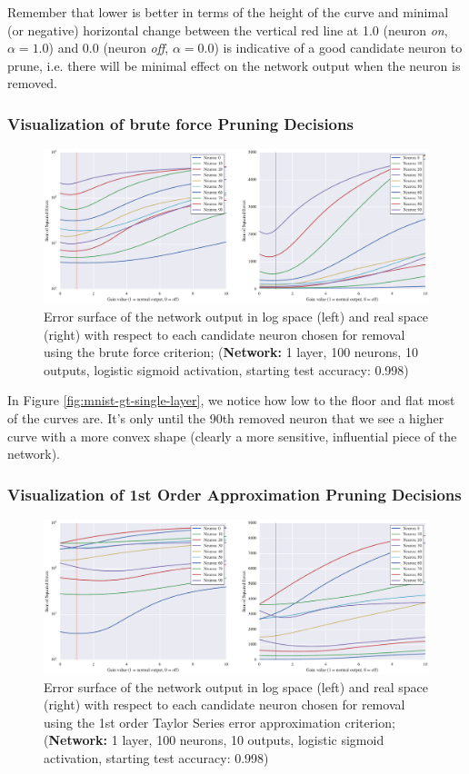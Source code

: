 Remember that lower is better in terms of the height of the curve and minimal (or negative) horizontal change between the vertical red line at 1.0 (neuron \textit{on}, $\alpha = 1.0$) and 0.0 (neuron \textit{off}, $\alpha = 0.0$) is indicative of a good candidate neuron to prune, i.e. there will be minimal effect on the network output when the neuron is removed. 

\subsubsection{Visualization of brute force Pruning Decisions}
\begin{figure}[!ht]
\centering
\includegraphics[width=\linewidth]{png/mnist-acc99-gt-gain.pdf}
\caption{Error surface of the network output in log space (left) and real space (right) with respect to each candidate neuron chosen for removal using the brute force criterion; (\textbf{Network:} 1 layer, 100 neurons, 10 outputs, logistic sigmoid activation, starting test accuracy: 0.998)}
\label{fig:mnist-single-layer-gt}
\end{figure}

In Figure \ref{fig:mnist-gt-single-layer}, we notice how low to the floor and flat most of the curves are. It's only until the 90th removed neuron that we see a higher curve with a more convex shape (clearly a more sensitive, influential piece of the network). 

\subsubsection{Visualization of 1st Order Approximation Pruning Decisions}
\begin{figure}[!ht]
\centering
\includegraphics[width=\linewidth]{png/mnist-acc99-g1-gain.pdf}
\caption{Error surface of the network output in log space (left) and real space (right) with respect to each candidate neuron chosen for removal using the 1st order Taylor Series error approximation criterion; (\textbf{Network:} 1 layer, 100 neurons, 10 outputs, logistic sigmoid activation, starting test accuracy: 0.998)}
\label{fig:mnist-single-layer-g1}
\end{figure}

